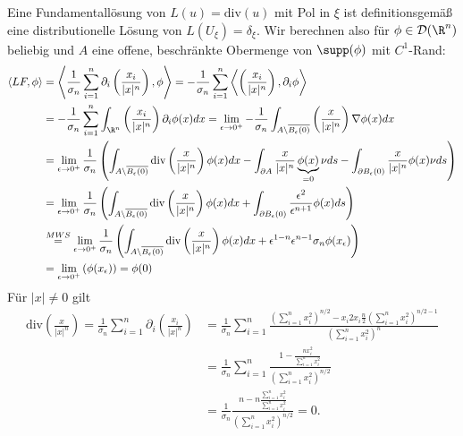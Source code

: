 \begin{solution}
Eine Fundamentallösung von $L(u) = \mathrm{div}(u)$ mit Pol in $\xi$ ist definitionsgemäß
eine distributionelle Lösung von $L(U_{\xi}) = \delta_{\xi}$. Wir berechnen also
für $\phi \in \mathcal{D}(\R^n)$ beliebig und $A$ eine offene, beschränkte Obermenge
von $\supp(\phi)$ mit $C^1$-Rand:
\begin{align*}
  \langle L F, \phi \rangle
  &= \left\langle \frac{1}{\sigma_n}\sum_{i = 1}^n\partial_i\left(\frac{x_i}{|x|^n}\right), \phi \right\rangle
  = -\frac{1}{\sigma_n}\sum_{i = 1}^n\left\langle \left(\frac{x_i}{|x|^n}\right), \partial_i\phi \right\rangle \\
  &= -\frac{1}{\sigma_n}\sum_{i = 1}^n\int_{\R^n}\left(\frac{x_i}{|x|^n}\right)\partial_i\phi(x)dx
  = \lim_{\epsilon \to 0^+}-\frac{1}{\sigma_n}\int_{A\backslash\overline{B_{\epsilon}(0)}}
  \left(\frac{x}{|x|^n}\right)\nabla \phi(x)dx \\
  &= \lim_{\epsilon \to 0^+}\frac{1}{\sigma_n}\left(\int_{A\backslash\overline{B_{\epsilon}(0)}}\mathrm{div}\left(\frac{x}{|x|^n}\right) \phi(x)dx
  - \int_{\partial A}\frac{x}{|x|^n}\underbrace{\phi(x)}_{=0}\nu ds
  - \int_{\partial B_{\epsilon}(0)}\frac{x}{|x|^n}\phi(x)\nu ds\right) \\
  &= \lim_{\epsilon \to 0^+}\frac{1}{\sigma_n}\left(\int_{A\backslash\overline{B_{\epsilon}(0)}}\mathrm{div}\left(\frac{x}{|x|^n}\right) \phi(x)dx
  + \int_{\partial B_{\epsilon}(0)}\frac{\epsilon^2}{\epsilon^{n+1}}\phi(x) ds\right) \\
  &\stackrel{MWS}{=} \lim_{\epsilon \to 0^+}\frac{1}{\sigma_n}\left(\int_{A\backslash\overline{B_{\epsilon}(0)}}\mathrm{div}\left(\frac{x}{|x|^n}\right) \phi(x)dx
  + \epsilon^{1-n}\epsilon^{n-1}\sigma_n\phi(x_{\epsilon})\right) \\
  &= \lim_{\epsilon \to 0^+}\left(\phi(x_{\epsilon})\right) = \phi(0)\\
\end{align*}
Für $|x| \neq 0$ gilt
\begin{align*}
  \mathrm{div}\left(\frac{x}{|x|^n}\right)
  =\frac{1}{\sigma_n}\sum_{i=1}^n\partial_i\left(\frac{x_i}{|x|^n}\right)
  &= \frac{1}{\sigma_n}\sum_{i=1}^n\frac{\left(\sum_{i=1}^nx_i^2\right)^{n/2} - x_i2x_i\frac{n}{2}\left(\sum_{i=1}^nx_i^2\right)^{n/2 - 1}}{\left(\sum_{i=1}^nx_i^2\right)^n} \\
  &= \frac{1}{\sigma_n}\sum_{i=1}^n\frac{1 - \frac{nx_i^2}{\sum_{i=1}^nx_i^2}}{\left(\sum_{i=1}^nx_i^2\right)^{n/2}} \\
  &= \frac{1}{\sigma_n}\frac{n - n\frac{\sum_{i=1}^nx_i^2}{\sum_{i=1}^nx_i^2}}{\left(\sum_{i=1}^nx_i^2\right)^{n/2}} = 0.
\end{align*}

\end{solution}

